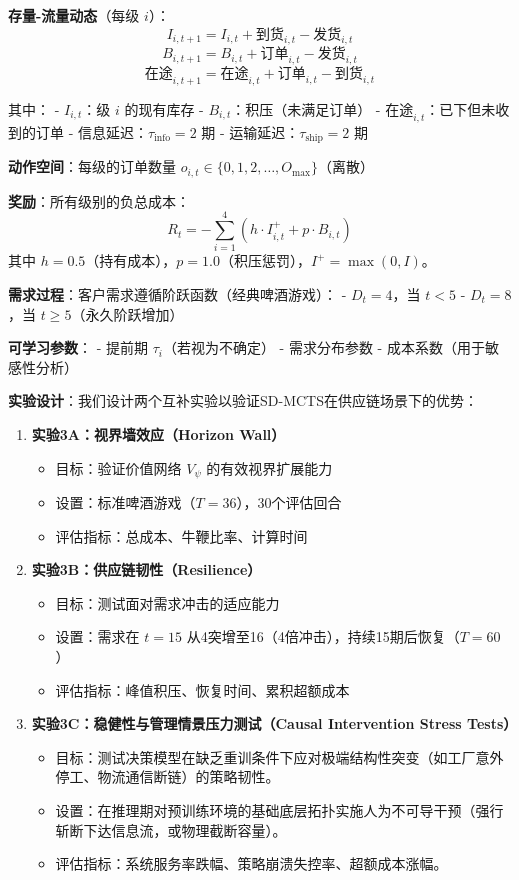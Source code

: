 \documentclass[UTF8]{ctexart}
\providecommand{\tightlist}{%
  \setlength{\itemsep}{0pt}\setlength{\parskip}{0pt}}
\begin{document}
\textbf{存量-流量动态}（每级 \(i\)）：
\[I_{i,t+1} = I_{i,t} + \text{到货}_{i,t} - \text{发货}_{i,t}\]
\[B_{i,t+1} = B_{i,t} + \text{订单}_{i,t} - \text{发货}_{i,t}\]
\[\text{在途}_{i,t+1} = \text{在途}_{i,t} + \text{订单}_{i,t} - \text{到货}_{i,t}\]

其中： - \(I_{i,t}\)：级 \(i\) 的现有库存 -
\(B_{i,t}\)：积压（未满足订单） -
\(\text{在途}_{i,t}\)：已下但未收到的订单 -
信息延迟：\(\tau_{\text{info}} = 2\) 期 -
运输延迟：\(\tau_{\text{ship}} = 2\) 期

\textbf{动作空间}：每级的订单数量
\(o_{i,t} \in \{0, 1, 2, \ldots, O_{\max}\}\)（离散）

\textbf{奖励}：所有级别的负总成本：
\[R_t = -\sum_{i=1}^{4} \left(h \cdot I_{i,t}^+ + p \cdot B_{i,t}\right)\]
其中
\(h = 0.5\)（持有成本），\(p = 1.0\)（积压惩罚），\(I^+ = \max(0, I)\)。

\textbf{需求过程}：客户需求遵循阶跃函数（经典啤酒游戏）： -
\(D_t = 4\)，当 \(t < 5\) - \(D_t = 8\)，当 \(t \geq 5\)（永久阶跃增加）

\textbf{可学习参数}： - 提前期 \(\tau_i\)（若视为不确定） - 需求分布参数
- 成本系数（用于敏感性分析）

\textbf{实验设计}：我们设计两个互补实验以验证SD-MCTS在供应链场景下的优势：

\begin{enumerate}
\def\labelenumi{\arabic{enumi}.}
\tightlist
\item
  \textbf{实验3A：视界墙效应（Horizon Wall）}

  \begin{itemize}
  \tightlist
  \item
    目标：验证价值网络 \(V_\psi\) 的有效视界扩展能力
  \item
    设置：标准啤酒游戏（\(T=36\)），30个评估回合
  \item
    评估指标：总成本、牛鞭比率、计算时间
  \end{itemize}
\item
  \textbf{实验3B：供应链韧性（Resilience）}

  \begin{itemize}
  \tightlist
  \item
    目标：测试面对需求冲击的适应能力
  \item
    设置：需求在 \(t=15\)
    从4突增至16（4倍冲击），持续15期后恢复（\(T=60\)）
  \item
    评估指标：峰值积压、恢复时间、累积超额成本
  \end{itemize}
\item
  \textbf{实验3C：稳健性与管理情景压力测试（Causal Intervention Stress
  Tests）}

  \begin{itemize}
  \tightlist
  \item
    目标：测试决策模型在缺乏重训条件下应对极端结构性突变（如工厂意外停工、物流通信断链）的策略韧性。
  \item
    设置：在推理期对预训练环境的基础底层拓扑实施人为不可导干预（强行斩断下达信息流，或物理截断容量）。
  \item
    评估指标：系统服务率跌幅、策略崩溃失控率、超额成本涨幅。
  \end{itemize}
\end{enumerate}
\end{document}
